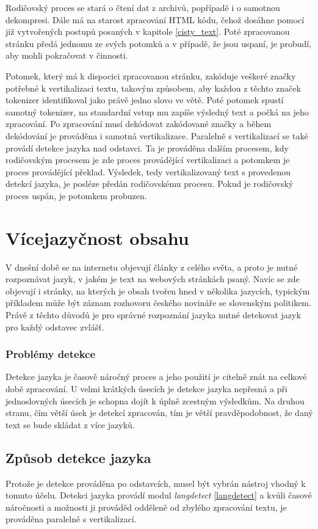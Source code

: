 Rodičovský proces se stará o čtení dat z archivů, popřípadě i o samotnou dekompresi. Dále má na starost zpracování
HTML kódu, čehož dosáhne pomocí již vytvořených postupů posaných v kapitole \ref{cisty_text}. Poté zpracovanou stránku
předá jednomu ze svých potomků a v případě, že jsou uspaní, je probudí, aby mohli pokračovat v činnosti.

Potomek, který má k dispocici zpracovanou stránku, zakóduje veškeré značky potřebné k vertikalizaci textu, takovým
způsobem, aby každou z těchto značek tokenizer identifikoval jako právě jedno slovo ve větě. Poté potomek spustí samotný
tokenizer, na standardní vstup mu zapíše výsledný text a počká na jeho zpracování. Po zpracování musí dekódovat
zakódované značky a během dekódování je prováděna i samotná vertikalizace. Paralelně s vertikalizací se také
provádí detekce jazyka nad odstavci. Ta je prováděna dalším procesem, kdy rodičovským procesem je zde proces
provádějící vertikalizaci a potomkem je proces provádějící překlad. Výsledek, tedy vertikalizovaný text
s provedenou detekcí jazyka, je posléze předán rodičovskému procesu. Pokud je rodičovský proces uspán, je potomkem probuzen.

\section{Vícejazyčnost obsahu}
V dnešní době se na internetu objevují články z celého světa, a proto je nutné rozpoznávat jazyk, v jakém je text na
webových stránkách psaný. Navíc se zde objevují i stránky, na kterých je obsah tvořen hned v několika jazycích, typickým
příkladem může být záznam rozhovoru českého novináře se slovenským politikem. Právě z těchto důvodů je pro správné
rozpoznání jazyka nutné detekovat jazyk pro každý odstavec zvlášť.

\subsubsection{Problémy detekce}
Detekce jazyka je časově náročný proces a jeho použití je citelně znát na celkové době zpracování. U velmi krátkých
úsecích je detekce jazyka nepřesná a při jednoslovných úsecích je schopna dojít k úplně zcestným výsledkům. Na druhou stranu,
čím větší úsek je detekcí zpracován, tím je větší pravděpodobnost, že daný text se bude skládat z více jazyků.

\subsection{Způsob detekce jazyka}
Protože je detekce prováděna po odstavcích, musel být vybrán nástroj vhodný k tomuto účelu.
Detekci jazyka provádí modul \textit{langdetect} \ref{langdetect} a kvůli časové náročnosti
a možnosti ji prováděd odděleně od zbylého zpracování textu, je prováděna paralelně s
vertikalizací.

